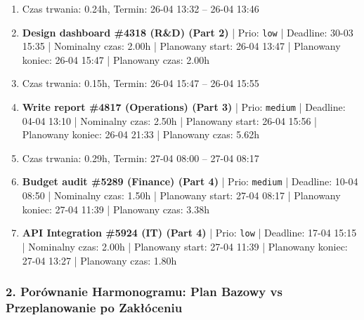 {\begin{enumerate}
  \item [\textbf{PRZERWA}] Czas trwania: 0.24h, Termin: 26-04 13:32 -- 26-04 13:46
  \item [\textbf{14691}] \textbf{Design dashboard \#4318 (R\&D) (Part 2)} | Prio: \texttt{low} | Deadline: 30-03 15:35 | Nominalny czas: 2.00h | Planowany start: 26-04 13:47 | Planowany koniec: 26-04 15:47 | Planowany czas: 2.00h
  \item [\textbf{PRZERWA}] Czas trwania: 0.15h, Termin: 26-04 15:47 -- 26-04 15:55
  \item [\textbf{14639}] \textbf{Write report \#4817 (Operations) (Part 3)} | Prio: \texttt{medium} | Deadline: 04-04 13:10 | Nominalny czas: 2.50h | Planowany start: 26-04 15:56 | Planowany koniec: 26-04 21:33 | Planowany czas: 5.62h
  \item [\textbf{PRZERWA}] Czas trwania: 0.29h, Termin: 27-04 08:00 -- 27-04 08:17
  \item [\textbf{14630}] \textbf{Budget audit \#5289 (Finance) (Part 4)} | Prio: \texttt{medium} | Deadline: 10-04 08:50 | Nominalny czas: 1.50h | Planowany start: 27-04 08:17 | Planowany koniec: 27-04 11:39 | Planowany czas: 3.38h
  \item [\textbf{14696}] \textbf{API Integration \#5924 (IT) (Part 4)} | Prio: \texttt{low} | Deadline: 17-04 15:15 | Nominalny czas: 2.00h | Planowany start: 27-04 11:39 | Planowany koniec: 27-04 13:27 | Planowany czas: 1.80h
\end{enumerate}
}

\subsubsection*{2. Porównanie Harmonogramu: Plan Bazowy vs Przeplanowanie po Zakłóceniu}

